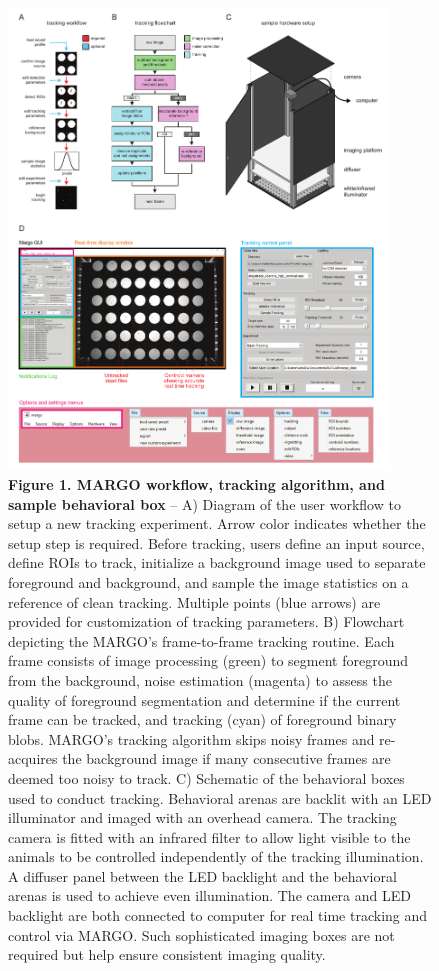 \documentclass[10pt]{article}
\begin{document}
\newpage
\begin{figure}[h!]
	\begin{center}
		\includegraphics[width=0.9\textwidth]{../figures/autotracker_overview.pdf}
	\end{center}
	\caption*{\footnotesize \textbf{Figure 1. MARGO workflow, tracking algorithm, and sample behavioral box} -- A) Diagram of the user workflow to setup a new tracking experiment. Arrow color indicates whether the setup step is required. Before tracking, users define an input source, define ROIs to track, initialize a background image used to separate foreground and background, and sample the image statistics on a reference of clean tracking. Multiple points (blue arrows) are provided for customization of tracking parameters. B) Flowchart depicting the MARGO's frame-to-frame tracking routine. Each frame consists of image processing (green) to segment foreground from the background, noise estimation (magenta) to assess the quality of foreground segmentation and determine if the current frame can be tracked, and tracking (cyan) of foreground binary blobs. MARGO's tracking algorithm skips noisy frames and re-acquires the background image if many consecutive frames are deemed too noisy to track. C) Schematic of the behavioral boxes used to conduct tracking. Behavioral arenas are backlit with an LED illuminator and imaged with an overhead camera. The tracking camera is fitted with an infrared filter to allow light visible to the animals to be controlled independently of the tracking illumination. A diffuser panel between the LED backlight and the behavioral arenas is used to achieve even illumination. The camera and LED backlight are both connected to computer for real time tracking and control via MARGO. Such sophisticated imaging boxes are not required but help ensure consistent imaging quality.}
\end{figure}
\end{document}
